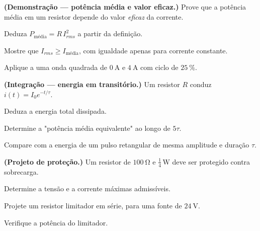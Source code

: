 \blocodesafio
\begin{questao}[4]{}

\textbf{(Demonstração --- potência média e valor eficaz.)} Prove que a potência
média em um resistor depende do valor \emph{eficaz} da corrente.
\begin{itensq}
\item Deduza $P_{\text{média}}=R\,I_{rms}^{2}$ a partir da definição.
\item Mostre que $I_{rms}\ge I_{\text{média}}$, com igualdade apenas para corrente
      constante.
\item Aplique a uma onda quadrada de $\SI{0}{\ampere}$ e
      $\SI{4}{\ampere}$ com ciclo de $\SI{25}{\percent}$.
\end{itensq}


\end{questao}
\begin{questao}[4]{}

\textbf{(Integração --- energia em transitório.)} Um resistor $R$ conduz
$i(t)=I_0e^{-t/\tau}$.
\begin{itensq}
\item Deduza a energia total dissipada.
\item Determine a "potência média equivalente" ao longo de $5\tau$.
\item Compare com a energia de um pulso retangular de mesma amplitude e
      duração $\tau$.
\end{itensq}


\end{questao}
\begin{questao}[4]{}

\textbf{(Projeto de proteção.)} Um resistor de $\SI{100}{\ohm}$ e
$\frac14\,\si{\watt}$ deve ser protegido contra sobrecarga.
\begin{itensq}
\item Determine a tensão e a corrente máximas admissíveis.
\item Projete um resistor limitador em série, para uma fonte de
      $\SI{24}{\volt}$.
\item Verifique a potência do limitador.
\end{itensq}


\end{questao}
